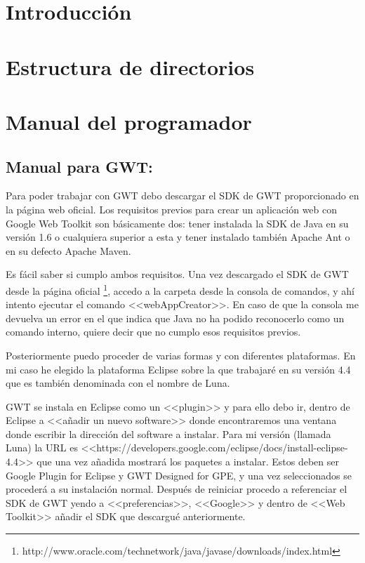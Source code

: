 
\section{Introducción}


\section{Estructura de directorios}

\section{Manual del programador}


\subsection{Manual para GWT:}

Para poder trabajar con GWT debo descargar el SDK de GWT proporcionado en la página web oficial. Los requisitos previos para crear un aplicación web con Google Web Toolkit son básicamente dos: tener instalada la SDK de Java en su versión 1.6 o cualquiera superior a esta y tener instalado también Apache Ant o en su defecto Apache Maven.

Es fácil saber si cumplo ambos requisitos. Una vez descargado el SDK de GWT desde la página oficial \footnote{http://www.oracle.com/technetwork/java/javase/downloads/index.html}, accedo a la carpeta desde la consola de comandos, y ahí intento ejecutar el comando <<webAppCreator>>. En caso de que la consola me devuelva un error en el que indica que Java no ha podido reconocerlo como un comando interno, quiere decir que no cumplo esos requisitos previos.

Posteriormente puedo proceder de varias formas y con diferentes plataformas.
En mi caso he elegido la plataforma Eclipse sobre la que trabajaré en su
versión 4.4 que es también denominada  con el nombre de Luna.

GWT se instala en Eclipse como un <<plugin>> y para ello debo ir, dentro de Eclipse a <<añadir un nuevo software>> donde encontraremos una ventana donde escribir la dirección del software a instalar. Para mi versión (llamada Luna) la URL es <<https://developers.google.com/eclipse/docs/install-eclipse-4.4>> que una vez añadida mostrará los paquetes a instalar. Estos deben ser Google Plugin for Eclipse y GWT Designed for GPE, y una vez seleccionados se procederá a su instalación normal. Después de reiniciar procedo a referenciar el SDK de GWT yendo a <<preferencias>>, <<Google>> y dentro de <<Web Toolkit>> añadir el SDK que descargué anteriormente. 

